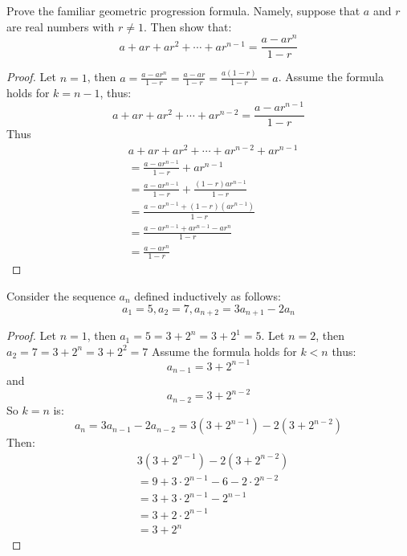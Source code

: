 \documentclass[8pt]{article}
\begin{document}
\begin{tcolorbox}[title=Problem 7, breakable]
    Prove the familiar geometric progression formula.
    Namely, suppose that $a$ and $r$ are real numbers with $r \not = 1$.
    Then show that:
    \[a + ar  + ar^2 + \cdots + ar^{n - 1} = \frac{a - ar^n}{1 - r}\]
\end{tcolorbox}

\begin{proof}
    Let $n = 1$, then $a = \frac{a - ar^n}{1 - r} = \frac{a - ar}{1 - r} = \frac{a(1 - r)}{1 - r} = a$.
    Assume the formula holds for $k = n - 1$, thus:
    \[a + ar + ar^2 + \cdots + ar^{n - 2} = \frac{a - ar^{n - 1}}{1 - r}\]
    Thus
    \begin{align*}
         & a + ar + ar^2 + \cdots + ar^{n - 2} + ar^{n - 1}                \\
         & =\frac{a - ar^{n - 1}}{1 - r} + ar^{n - 1}                      \\
         & =\frac{a - ar^{n - 1}}{1 - r} + \frac{(1 - r)ar^{n - 1}}{1 - r} \\
         & =\frac{a - ar^{n - 1} + (1 - r)(ar^{n - 1})}{1 - r}             \\
         & =\frac{a - ar^{n - 1} + ar^{n - 1} - ar^n}{1 - r}               \\
         & =\frac{a - ar^n}{1 - r}
    \end{align*}
\end{proof}

\begin{tcolorbox}[title=Problem 12, breakable]
    Consider the sequence ${a_n}$ defined inductively as follows:
    \[a_1 = 5, a_2  = 7, a_{n + 2} = 3a_{n + 1} - 2a_n\]
\end{tcolorbox}

\begin{proof}
    Let $n = 1$, then $a_1 = 5 = 3 + 2^n =  3 + 2^1 = 5$.
    Let $n = 2$, then $a_2 = 7 = 3 + 2^n = 3 + 2^2 = 7$
    Assume the formula holds for $k < n$ thus:
    \[a_{n - 1} = 3 + 2^{n - 1}\]
    and 
    \[a_{n - 2} = 3 + 2^{n - 2}\]
    So $k = n$ is:
    \[a_{n} = 3a_{n - 1} - 2a_{n - 2} = 3(3 + 2^{n - 1}) - 2(3 + 2^{n - 2})\]
    Then:
    \begin{align*}
         & 3(3 + 2^{n - 1}) - 2(3 + 2^{n - 2})             \\
         & = 9 + 3 \cdot 2^{n - 1} - 6 - 2 \cdot 2^{n - 2} \\
         & = 3 + 3 \cdot 2^{n - 1} - 2^{n - 1}             \\
         & = 3 + 2 \cdot 2^{n - 1}                         \\
         & = 3 + 2^n                            
    \end{align*}
\end{proof}
\end{document}
